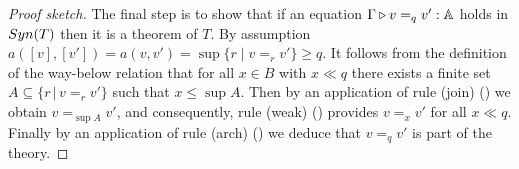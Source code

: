 \documentclass[a4paper,UKenglish,cleveref, autoref, thm-restate]{lipics-v2021}
\begin{document}
\begin{proof}[Proof sketch]
The final step is to show that if an equation $\Gamma \triangleright v =_q v' : \mathbb{A}$
holds in $\catfont{Syn}(T)$ then it is a theorem of $T$. By
assumption $a([v],[v']) = a(v,v') =  \sup{ \{r \mid v =_r v'\}} \geq q$. It
follows from the definition of the way-below relation that for all $x \in B$
with $x \ll q$ there exists a finite set $A \subseteq \{r \, \vert \, v =_r
v'\}$ such that $x \leq \sup A$. Then by an application of rule (join)
(\cite[Figure 4]{dahlqvist2023syntactic}) we obtain $v =_{\sup A } v'$, and
consequently, rule (weak) (\cite[Figure 4]{dahlqvist2023syntactic}) provides $v
=_x v'$ for all $x \ll q$. Finally by an application of rule (arch)
(\cite[Figure 4]{dahlqvist2023syntactic}) we deduce that $v =_q v'$ is part of
the theory.


\end{proof}
%
\end{document}
